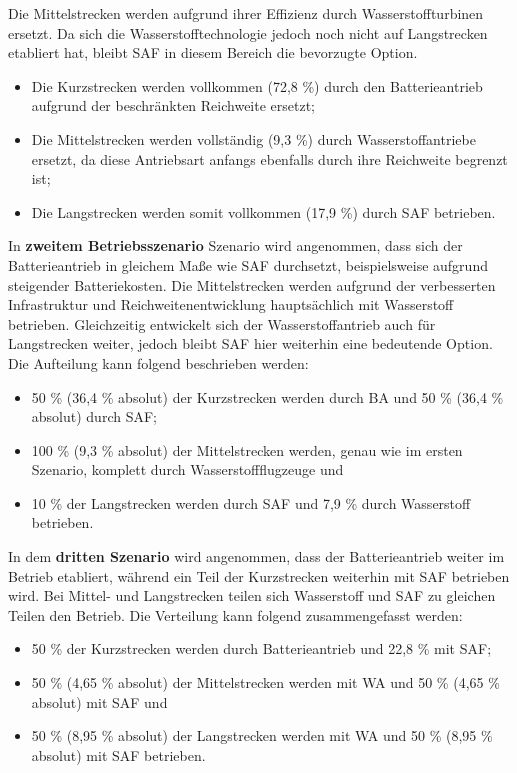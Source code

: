 Die Mittelstrecken werden aufgrund ihrer Effizienz durch Wasserstoffturbinen ersetzt. 
Da sich die Wasserstofftechnologie jedoch noch nicht auf Langstrecken etabliert hat, 
bleibt SAF in diesem Bereich die bevorzugte Option.
\begin{itemize}
    \item Die Kurzstrecken werden vollkommen (72,8 \%) durch den Batterieantrieb aufgrund der beschränkten Reichweite ersetzt;
    \item Die Mittelstrecken werden vollständig (9,3 \%) durch Wasserstoffantriebe ersetzt, 
	da diese Antriebsart anfangs ebenfalls durch ihre Reichweite begrenzt ist;
    \item Die Langstrecken werden somit vollkommen (17,9 \%) durch SAF betrieben.
\end{itemize}
%
In \textbf{zweitem Betriebsszenario} Szenario wird angenommen, dass sich der Batterieantrieb in gleichem Maße 
wie SAF durchsetzt, beispielsweise aufgrund steigender Batteriekosten. 
Die Mittelstrecken werden aufgrund der verbesserten Infrastruktur und 
Reichweitenentwicklung hauptsächlich mit Wasserstoff betrieben. 
Gleichzeitig entwickelt sich der Wasserstoffantrieb auch für Langstrecken weiter, 
jedoch bleibt SAF hier weiterhin eine bedeutende Option.
Die Aufteilung kann folgend beschrieben werden:
\begin{itemize}
    \item 50 \% (36,4 \% absolut) der Kurzstrecken werden durch BA und 50 \% (36,4 \% absolut) durch SAF; 
    \item 100 \% (9,3 \% absolut) der Mittelstrecken werden, genau wie im ersten Szenario, 
	komplett durch Wasserstoffflugzeuge und
    \item 10 \% der Langstrecken werden durch SAF und 7,9 \% durch Wasserstoff betrieben.
\end{itemize}
In dem \textbf{dritten Szenario} wird angenommen, dass der Batterieantrieb weiter im Betrieb etabliert, 
während ein Teil der Kurzstrecken weiterhin mit SAF betrieben wird. Bei Mittel- 
und Langstrecken teilen sich Wasserstoff und SAF zu gleichen Teilen den Betrieb.
Die Verteilung kann folgend zusammengefasst werden:
\begin{itemize}
    \item 50 \% der Kurzstrecken werden durch Batterieantrieb und 22,8 \% mit SAF;
    \item 50 \% (4,65 \% absolut) der Mittelstrecken werden mit WA und 50 \% (4,65 \% absolut) mit SAF und 
    \item 50 \% (8,95 \% absolut) der Langstrecken werden mit WA und 50 \% (8,95 \% absolut) mit SAF betrieben. 
\end{itemize} %
